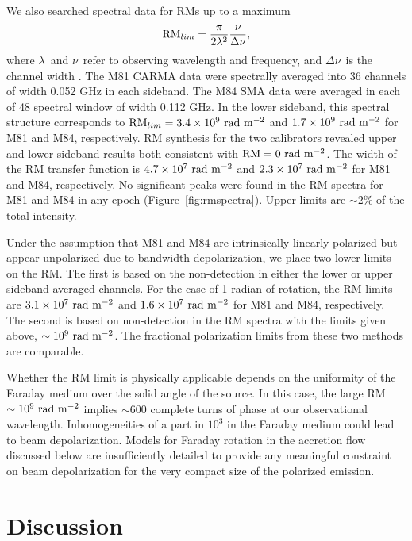 \documentclass[12pt,preprint]{aastex}
\begin{document}
We also searched spectral data for RMs up to a maximum
\begin{equation}
{\rm RM}_{lim} = {\pi \over 2 \lambda^2} {\nu \over \Delta\nu},
\end{equation}
where $\lambda$\ and $\nu$\ refer to observing wavelength and frequency, and $\Delta\nu$\ 
is the channel width \citep{2005A&A...441.1217B}.  The M81 CARMA data were spectrally averaged into 36 channels of width 0.052
GHz in each sideband.  The M84 SMA data were averaged in each of 48 spectral window of width 0.112
GHz. In the lower sideband, this spectral structure corresponds to ${\rm RM}_{lim}=3.4 \times 10^9 {\rm\ rad\ m^{-2}}$ and $1.7 \times 10^9 {\rm\ rad\ m^{-2}}$ for M81 and M84, respectively.  RM synthesis for the two calibrators revealed 
upper and lower sideband results both consistent with ${\rm RM}=0 {\rm\ rad\ m^{-2}}$.  The width of the RM 
transfer function is $4.7 \times 10^7 {\rm\ rad\ m^{-2}}$ and $2.3 \times 10^7 {\rm\ rad\ m^{-2}}$ for M81 and M84, respectively. 
No significant peaks were 
found in the RM spectra for M81 and M84 in any epoch (Figure~\ref{fig:rmspectra}).  Upper limits are $\sim 2\%$ of the total intensity.

Under the assumption that M81 and M84 are intrinsically linearly polarized but appear
unpolarized due to bandwidth depolarization, 
we place two lower limits on the {\rm RM}.  The first is based on the non-detection in
either the lower or upper sideband averaged channels.  For the case of 1 radian of rotation, 
the RM limits are $3.1 \times 10^7 {\rm\ rad\ m^{-2}}$
and $1.6 \times 10^7 {\rm\ rad\ m^{-2}}$ for M81 and M84, respectively.  The second is based on
non-detection in the RM spectra with the limits given above, $\sim 10^9 {\rm\ rad\ m^{-2}}$.
The fractional polarization limits from these two methods are comparable.

Whether the RM limit is physically applicable depends on the uniformity of the Faraday medium 
over the solid angle of the source.  In this case,
the large RM $\sim 10^9 {\rm\ rad\ m^{-2}}$ implies $\sim 600$ complete turns of phase at our observational
wavelength.  Inhomogeneities of a part in $10^3$ in the Faraday medium could lead to beam depolarization.  
Models for Faraday rotation in the accretion flow discussed below are insufficiently detailed to 
provide any meaningful constraint on beam depolarization for the very compact size of the polarized emission.

\section{Discussion}
\end{document}
